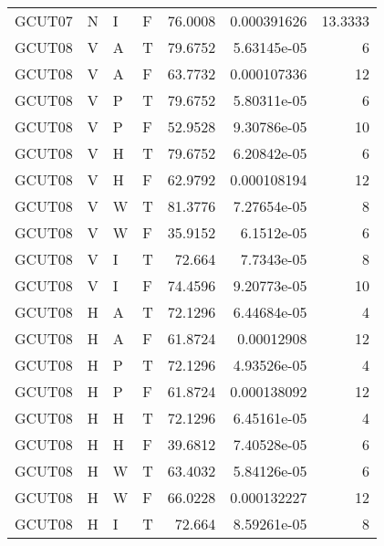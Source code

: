 \begin{longtable}{llllrrr}
    GCUT07   & N         & I         & F          & 76.0008    & 0.000391626 & 13.3333  \\
    GCUT08   & V         & A         & T          & 79.6752    & 5.63145e-05 & 6        \\
    GCUT08   & V         & A         & F          & 63.7732    & 0.000107336 & 12       \\
    GCUT08   & V         & P         & T          & 79.6752    & 5.80311e-05 & 6        \\
    GCUT08   & V         & P         & F          & 52.9528    & 9.30786e-05 & 10       \\
    GCUT08   & V         & H         & T          & 79.6752    & 6.20842e-05 & 6        \\
    GCUT08   & V         & H         & F          & 62.9792    & 0.000108194 & 12       \\
    GCUT08   & V         & W         & T          & 81.3776    & 7.27654e-05 & 8        \\
    GCUT08   & V         & W         & F          & 35.9152    & 6.1512e-05  & 6        \\
    GCUT08   & V         & I         & T          & 72.664     & 7.7343e-05  & 8        \\
    GCUT08   & V         & I         & F          & 74.4596    & 9.20773e-05 & 10       \\
    GCUT08   & H         & A         & T          & 72.1296    & 6.44684e-05 & 4        \\
    GCUT08   & H         & A         & F          & 61.8724    & 0.00012908  & 12       \\
    GCUT08   & H         & P         & T          & 72.1296    & 4.93526e-05 & 4        \\
    GCUT08   & H         & P         & F          & 61.8724    & 0.000138092 & 12       \\
    GCUT08   & H         & H         & T          & 72.1296    & 6.45161e-05 & 4        \\
    GCUT08   & H         & H         & F          & 39.6812    & 7.40528e-05 & 6        \\
    GCUT08   & H         & W         & T          & 63.4032    & 5.84126e-05 & 6        \\
    GCUT08   & H         & W         & F          & 66.0228    & 0.000132227 & 12       \\
    GCUT08   & H         & I         & T          & 72.664     & 8.59261e-05 & 8        \\

\end{longtable}
